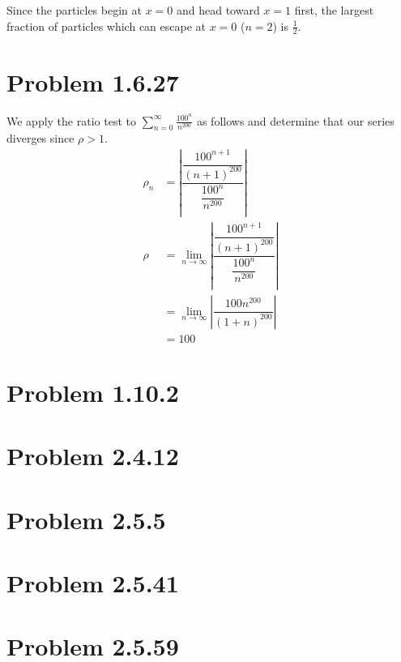 \documentclass[letterpaper,10pt]{article}
\begin{document}
Since the particles begin at $x=0$ and head toward $x=1$ first, the largest fraction of particles which can escape at $x=0$ ($n=2$) is $\frac{1}{2}$.

\section*{Problem 1.6.27}
We apply the ratio test to $\sum\limits^{\infty}_{n=0}\frac{100^{n}}{n^{200}}$ as follows and determine that our series diverges since $\rho > 1$.
\begin{align*}
	\rho_{n} &= \left\lvert{\dfrac{\dfrac{100^{n+1}}{(n+1)^{200}}}{\dfrac{100^{n}}{n^{200}}}}\right\rvert \\
	\rho &= \lim_{n\to\infty}\left\lvert{\dfrac{\dfrac{100^{n+1}}{(n+1)^{200}}}{\dfrac{100^{n}}{n^{200}}}}\right\rvert \\
	&= \lim_{n\to\infty}\left\lvert \dfrac{100 n^{200}}{(1+n)^{200}}\right\rvert \\
	&= 100
\end{align*}

\section*{Problem 1.10.2}

\section*{Problem 2.4.12}

\section*{Problem 2.5.5}

\section*{Problem 2.5.41}

\section*{Problem 2.5.59}
\end{document}

